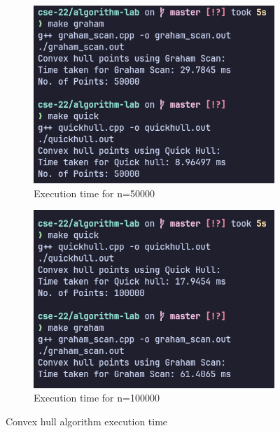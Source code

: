 \begin{figure}[H]
\begin{subfigure}[b]{0.4\textwidth}
        \includegraphics[width=\textwidth]{./img/lab2/p50k.png}
        \caption{Execution time for n=50000}
    \end{subfigure}
    \hfill
    \begin{subfigure}[b]{0.4\textwidth}
        \centering
        \includegraphics[width=\textwidth]{./img/lab2/p1lack.png}
        \caption{Execution time for n=100000}
    \end{subfigure}
    
    \caption{Convex hull algorithm execution time}
    \label{fig:task1}

\end{figure}


